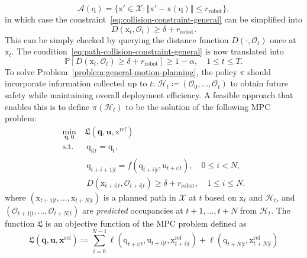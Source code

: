 \documentclass[lettersize,journal]{IEEEtran}
\begin{document}
\begin{equation*}
\mathcal{A}(\mathrm{q}) = \{\mathrm{x}' \in \mathcal{X}: \left\Vert \mathrm{x}' - \mathrm{x}(\mathrm{q}) \right\Vert \leq r_{\text{robot}}  \},
\end{equation*}
in which case the constraint~\eqref{eq:collision-constraint-general} can be simplified into
\begin{equation}\label{eq:collision-constraint}
D(\mathrm{x}_t, \mathcal{O}_t) \geq \delta + r_{\text{robot}}.
\end{equation}
This can be simply checked by querying the distance function $D(\cdot, \mathcal{O}_t)$ once at $\mathrm{x}_t$. The condition~\eqref{eq:path-collision-constraint-general} is now translated into
\begin{equation}\label{eq:path-collision-constraint}
\mathbb{P}\left[ D(\mathrm{x}_t, \mathcal{O}_t) \geq \delta + r_{\text{robot}} \right] \geq 1 - \alpha, \quad 1\leq t \leq T.
\end{equation}
To solve Problem~\ref{problem:general-motion-planning}, the policy $\pi$ should incorporate information  collected up to $t$: $\mathcal{H}_t \coloneqq(\mathcal{O}_0, \ldots, \mathcal{O}_t)$ to obtain future safety while maintaining overall deployment efficiency.
A feasible approach that enables this is to define $\pi(\mathcal{H}_t)$ to be the solution of the following MPC problem:
\begin{align}
\min_{\mathbf{q}, \mathbf{u}}&\ \mathfrak{L}(\mathbf{q}, \mathbf{u}, \mathrm{x}^{\text{ref}}) \nonumber \\
\text{s.t.}
&\ \ \mathrm{q}_{t|t} = \mathrm{q}_t, \nonumber \\
&\ \ \mathrm{q}_{t+i+1|t} = f(\mathrm{q}_{t+i|t}, \mathrm{u}_{t+i|t}), \quad 0 \leq i < N, \nonumber\\
&\ \ D(\mathrm{x}_{t+i|t}, \mathcal{O}_{t+i|t}) \geq \delta + r_{\text{robot}}, \quad 1\leq i \leq N. \label{eq:mpc-constraint-naive}
\end{align}
where $(\mathrm{x}_{t+1|t}, \ldots,\mathrm{x}_{t+N|t})$ is a planned path in $\mathcal{X}$ at $t$ based on $\mathrm{x}_t$ and $\mathcal{H}_t$, and  $(\mathcal{O}_{t+1|t}, \ldots, \mathcal{O}_{t+N|t})$ are \emph{predicted} occupancies at $t+1, \ldots, t+N$ from $\mathcal{H}_t$. The function $\mathfrak{L}$ is an objective function of the MPC problem defined as
\begin{equation*}
\mathfrak{L}(\mathbf{q}, \mathbf{u}, \mathbf{x}^{\text{ref}}) \coloneqq \sum_{i=0}^{N-1} \ell(\mathrm{q}_{t+i|t}, \mathrm{u}_{t+i|t}, \mathrm{x}^{\text{ref}}_{t+i|t}) + \ell(\mathrm{q}_{t+N|t}, \mathrm{x}^{\text{ref}}_{t+N|t})
\end{equation*}
\end{document}
